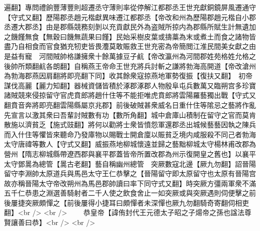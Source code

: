 遍翻】專問禮餉豐薄豐則超遷丞守薄則率從停解江都郡丞王世充獻銅鏡屏風遷通守【守式又翻】歷陽郡丞趙元楷獻異味遷江都郡丞【帝改和州為歷陽郡趙元楷自小郡丞遷大郡丞】由是郡縣競務刻剝以充貢獻民外為盗賊所掠内為郡縣所賦生計無遺加之饑饉無食【無穀曰饑無蔬果曰饉】民始采樹皮葉或擣藁為末或煮土而食之諸物皆盡乃自相食而官食猶充牣吏皆畏灋莫敢賑救王世充密為帝簡閲江淮民間美女獻之由是益有寵　河間賊帥格謙擁衆十餘萬據豆子䴚【帝改瀛州為河間郡姓苑格姓允格之後帥所類翻䴚各朗翻】自稱燕王帝命王世充將兵討斬之謙將勃海高開道【帝改滄州為勃海郡燕因肩翻將即亮翻下同】收其餘衆寇掠燕地軍勢復振【復扶又翻】　初帝謀伐高麗【麗力知翻】器械資儲皆積於涿郡涿郡人物殷阜屯兵數萬又臨朔宫多珍寶諸賊競來侵掠留守官虎賁郎將趙什住等不能拒唯虎賁郎將雲陽羅藝獨出戰【守式又翻賁音奔將即亮翻雲陽縣屬京兆郡】前後破賊甚衆威名日重什住等隂忌之藝將作亂先宣言以激其衆曰吾輩討賊數有功【數所角翻】城中倉庫山積制在留守之官而莫肯散施以濟貧乏【施式豉翻】將何以勸將士衆皆憤怨軍還郡丞出城候藝藝因執之陳兵而入什住等懼皆來聽命乃發庫物以賜戰士開倉廩以賑貧乏境内咸服殺不同己者勃海太守唐禕等數人【守式又翻】威振燕地柳城懷遠並歸之藝黜柳城太守楊林甫改郡為營州【隋志柳城縣帶遼西郡與襄平郡蓋皆帝所置改郡為州示復開皇之舊也】以襄平太守鄧暠為總管【暠古老翻】藝自稱幽州總管　突厥數寇北邊【厥九勿翻】詔晉陽留守李淵帥太原道兵與馬邑太守王仁恭擊之【晉陽留守即太原留守也太原有晉陽宫故亦稱晉陽太守帝改朔州為馬邑郡帥讀曰率下同守式又翻】時突厥方彊兩軍衆不滿五千仁恭患之淵選善騎射者二千人使之飲食舍止一如突厥或與突厥遇則伺便擊之前後屢捷突厥頗憚之【前後屢得小捷耳曰頗憚者未深憚也厥九勿翻騎奇寄翻伺相吏翻】<br />
<br />
　　恭皇帝【諱侑封代王元德太子昭之子煬帝之孫也諡法尊賢讓善曰恭】<br />
<br />
